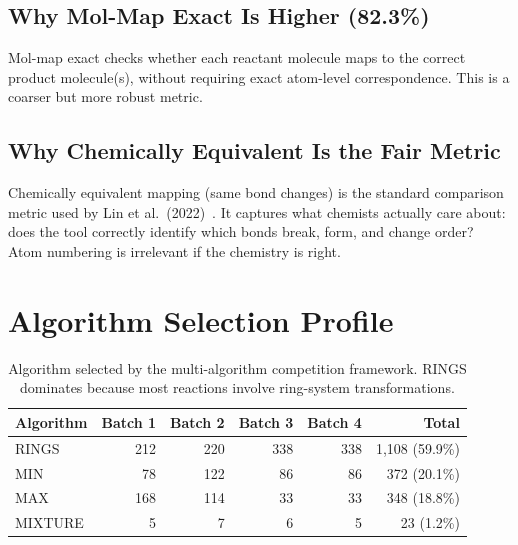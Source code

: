 \documentclass[11pt,a4paper]{article}
\begin{document}
\subsection{Why Mol-Map Exact Is Higher (82.3\%)}

Mol-map exact checks whether each reactant molecule maps to the correct product
molecule(s), without requiring exact atom-level correspondence. This is a coarser
but more robust metric.

\subsection{Why Chemically Equivalent Is the Fair Metric}

Chemically equivalent mapping (same bond changes) is the standard comparison
metric used by Lin et al.\ (2022)~\cite{lin2022}. It captures what chemists
actually care about: does the tool correctly identify which bonds break, form,
and change order? Atom numbering is irrelevant if the chemistry is right.


\section{Algorithm Selection Profile}

\begin{table}[H]
\centering
\begin{tabular}{lrrrr|r}
\toprule
\textbf{Algorithm} & \textbf{Batch 1} & \textbf{Batch 2} & \textbf{Batch 3} &
\textbf{Batch 4} & \textbf{Total} \\
\midrule
RINGS   & 212 & 220 & 338 & 338 & 1,108 (59.9\%) \\
MIN     &  78 & 122 &  86 &  86 &   372 (20.1\%) \\
MAX     & 168 & 114 &  33 &  33 &   348 (18.8\%) \\
MIXTURE &   5 &   7 &   6 &   5 &    23 (1.2\%) \\
\bottomrule
\end{tabular}
\caption{Algorithm selected by the multi-algorithm competition framework.
RINGS dominates because most reactions involve ring-system transformations.}
\label{tab:algorithms}
\end{table}


\end{document}
